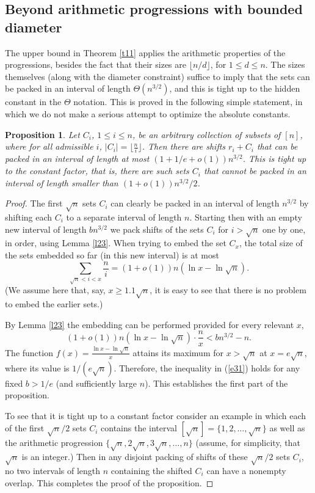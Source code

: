 \documentclass[12pt]{amsart}
\theoremstyle{plain}
\newtheorem{proposition}{Proposition}
\numberwithin{equation}{section}
\begin{document}
\subsection{Beyond arithmetic progressions with bounded diameter}
	The upper bound in Theorem \ref{t11} applies the arithmetic properties of the progressions, besides the fact that their sizes are $\lfloor  n/d \rfloor$, for $1 \leqslant d \leqslant n$. The sizes themselves (along with the diameter constraint) suffice to imply that the sets can be packed in an interval of length $\Theta(n^{3/2})$, and this is tight up to the hidden constant
in the $\Theta$ notation. This is proved in the following simple statement, in which we do not make a serious attempt to optimize the absolute constants.
\begin{proposition}
	\label{p32}
	Let $C_i$, $1 \leqslant i \leqslant n$, be an arbitrary collection of subsets of $[n]$, where for all admissible $i$, $|C_i|=\lfloor \frac{n}{i} \rfloor$. Then there are shifts $r_i+C_i$ that can be packed in an interval
	of length at most $(1+1/e+o(1))n^{3/2}$. This is tight up to the constant factor, that is, there are such sets $C_i$ that cannot be packed in an interval of length smaller than $(1+o(1))n^{3/2}/2$.
\end{proposition}
\begin{proof}
	The first $\sqrt n$ sets $C_i$ can clearly be packed in an interval of length $n^{3/2}$ by shifting each $C_i$ to a separate interval of length $n$. Starting  then with an empty new interval of length 
	$bn^{3/2}$ we pack shifts of the sets $C_i$ for $i > \sqrt n$ one by one, in order, using Lemma \ref{l23}. When trying to embed the set $C_x$, the total size of the sets embedded so far (in this new interval) is
	at most 
	$$
	\sum_{\sqrt n < i<x} \frac{n}{i} =
	(1+o(1)) n (\ln x - \ln {\sqrt n}).
	$$
	(We assume here that, say, $x \geqslant 1.1 \sqrt n $, it is easy to see that there is no problem to embed the earlier sets.)
	
	By Lemma \ref{l23} the embedding can be performed provided for every relevant $x$,
	\begin{equation}
		\label{e31}
		(1+o(1)) n (\ln x - \ln {\sqrt n}) \cdot \frac{n}{x} < b n^{3/2}-n.
	\end{equation}
	The function $f(x)=\frac{\ln x -\ln \sqrt n}{x}$ attains its maximum for $x > \sqrt n$ at $x=e \sqrt n$, where its value is $1/(e \sqrt n)$. Therefore, the inequality in (\ref{e31}) holds for any fixed $b>1/e$ (and sufficiently large $n$). This establishes the first part of the proposition.
	
	To see that it is tight up to a constant factor consider an example in which each of the first $\sqrt n/2$ sets $C_i$ contains the interval	$[\sqrt n]=\{1,2, \ldots ,\sqrt n\}$ as well as the arithmetic progression $\{\sqrt n, 2 \sqrt n, 3 \sqrt n, \ldots,n\}$ (assume, for simplicity, that $\sqrt n $ is an integer.) Then in any disjoint packing of shifts of these $\sqrt n/2$ sets $C_i$, no two intervals of length $n$ containing the shifted $C_i$ can have a nonempty overlap. This completes the proof of the proposition.
\end{proof}
\end{document}
